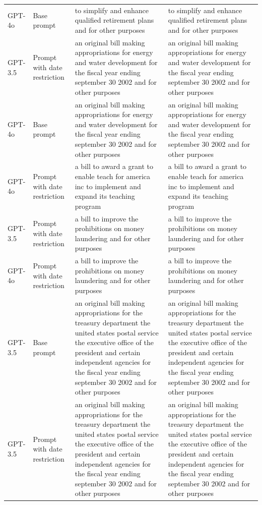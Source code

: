 \begin{longtable}{>{\raggedright\arraybackslash}p{1.4cm}>{\raggedright\arraybackslash}p{1.4cm}>{\raggedright\arraybackslash}p{5.5cm}>{\raggedright\arraybackslash}p{5.5cm}}
GPT-4o & Base prompt & to simplify and enhance qualified retirement plans and for other purposes & to simplify and enhance qualified retirement plans and for other purposes\\
GPT-3.5 & Prompt with date restriction & an original bill making appropriations for energy and water development for the fiscal year ending september 30 2002 and for other purposes & an original bill making appropriations for energy and water development for the fiscal year ending september 30 2002 and for other purposes\\
GPT-4o & Base prompt & an original bill making appropriations for energy and water development for the fiscal year ending september 30 2002 and for other purposes & an original bill making appropriations for energy and water development for the fiscal year ending september 30 2002 and for other purposes\\
GPT-4o & Prompt with date restriction & a bill to award a grant to enable teach for america inc to implement and expand its teaching program & a bill to award a grant to enable teach for america inc to implement and expand its teaching program\\
GPT-3.5 & Prompt with date restriction & a bill to improve the prohibitions on money laundering and for other purposes & a bill to improve the prohibitions on money laundering and for other purposes\\
GPT-4o & Prompt with date restriction & a bill to improve the prohibitions on money laundering and for other purposes & a bill to improve the prohibitions on money laundering and for other purposes\\
GPT-3.5 & Base prompt & an original bill making appropriations for the treasury department the united states postal service the executive office of the president and certain independent agencies for the fiscal year ending september 30 2002 and for other purposes & an original bill making appropriations for the treasury department the united states postal service the executive office of the president and certain independent agencies for the fiscal year ending september 30 2002 and for other purposes\\
GPT-3.5 & Prompt with date restriction & an original bill making appropriations for the treasury department the united states postal service the executive office of the president and certain independent agencies for the fiscal year ending september 30 2002 and for other purposes & an original bill making appropriations for the treasury department the united states postal service the executive office of the president and certain independent agencies for the fiscal year ending september 30 2002 and for other purposes\\

\end{longtable}
